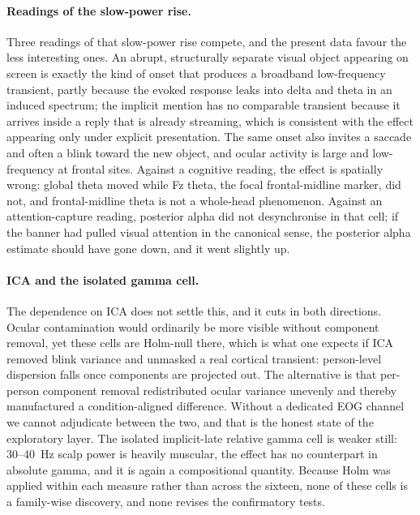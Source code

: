 \documentclass[english]{article}
\begin{document}
\paragraph{Readings of the slow-power rise.}
Three readings of that slow-power rise compete, and the present data favour the less interesting ones. An abrupt, structurally separate visual object appearing on screen is exactly the kind of onset that produces a broadband low-frequency transient, partly because the evoked response leaks into delta and theta in an induced spectrum; the implicit mention has no comparable transient because it arrives inside a reply that is already streaming, which is consistent with the effect appearing only under explicit presentation. The same onset also invites a saccade and often a blink toward the new object, and ocular activity is large and low-frequency at frontal sites. Against a cognitive reading, the effect is spatially wrong: global theta moved while Fz theta, the focal frontal-midline marker, did not, and frontal-midline theta is not a whole-head phenomenon. Against an attention-capture reading, posterior alpha did not desynchronise in that cell; if the banner had pulled visual attention in the canonical sense, the posterior alpha estimate should have gone down, and it went slightly up.

\paragraph{ICA and the isolated gamma cell.}
The dependence on ICA does not settle this, and it cuts in both directions. Ocular contamination would ordinarily be more visible without component removal, yet these cells are Holm-null there, which is what one expects if ICA removed blink variance and unmasked a real cortical transient: person-level dispersion falls once components are projected out. The alternative is that per-person component removal redistributed ocular variance unevenly and thereby manufactured a condition-aligned difference. Without a dedicated EOG channel we cannot adjudicate between the two, and that is the honest state of the exploratory layer. The isolated implicit-late relative gamma cell is weaker still: 30--40~Hz scalp power is heavily muscular, the effect has no counterpart in absolute gamma, and it is again a compositional quantity. Because Holm was applied within each measure rather than across the sixteen, none of these cells is a family-wise discovery, and none revises the confirmatory tests.
\end{document}
